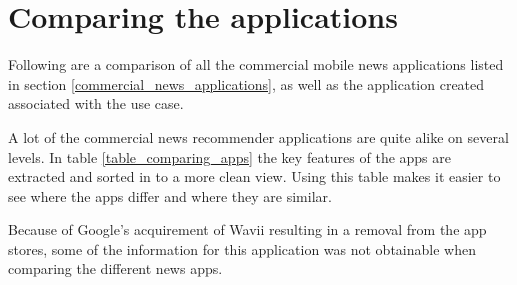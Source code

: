 \chapter{Comparing the applications}
Following are a comparison of all the commercial mobile news applications listed in section \ref{commercial_news_applications}, as well as the application created associated with the use case.


A lot of the commercial news recommender applications are quite alike on several levels. In table \ref{table_comparing_apps} the key features of the apps are extracted and sorted in to a more clean view. Using this table makes it easier to see where the apps differ and where they are similar. 

Because of Google's acquirement of Wavii resulting in a removal from the app stores, some of the information for this application was not obtainable when comparing the different news apps.


